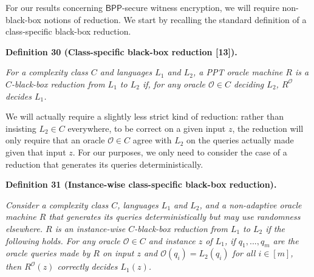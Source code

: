 


For our results concerning ${\mathsf{BPP}}$-secure witness encryption, we will require non-black-box notions of reduction. We start by recalling the standard definition of a class-specific black-box reduction.\par





\par\medskip\noindent\textbf{
\textbf{Definition 30}\textbf{ }(Class-specific black-box reduction [13])\textbf{.}
}\par



\emph{For a complexity class $C$ and languages $L_{1}$ and $L_{2}$, a PPT oracle machine $R$ is a $C$-black-box reduction from $L_{1}$ to $L_{2}$ if, for any oracle $\mathcal{O}\in C$ deciding $L_{2}$, $R^{\mathcal{O}}$ decides $L_{1}$.}\par






We will actually require a slightly less strict kind of reduction: rather than insisting $L_{2}\in C$ everywhere, to be correct on a given input $z$, the reduction will only require that an oracle $\mathcal{O}\in C$ agree with $L_{2}$ on the queries actually made given that input $z$. For our purposes, we only need to consider the case of a reduction that generates its queries deterministically.\par





\par\medskip\noindent\textbf{
\textbf{Definition 31}\textbf{ }(Instance-wise class-specific black-box reduction)\textbf{.}
}\par



\emph{Consider a complexity class $C$, languages $L_{1}$ and $L_{2}$, and a non-adaptive oracle machine $R$ that generates its queries deterministically but may use randomness elsewhere. $R$ is an instance-wise $C$-black-box reduction from $L_{1}$ to $L_{2}$ if the following holds. For any oracle $\mathcal{O}\in C$ and instance $z$ of $L_{1}$, if $q_{1},...,q_{m}$ are the oracle queries made by $R$ on input $z$ and $\mathcal{O}(q_{i})=L_{2}(q_{i})$ for all $i\in[m]$, then $R^{\mathcal{O}}(z)$ correctly decides $L_{1}(z)$.}\par



